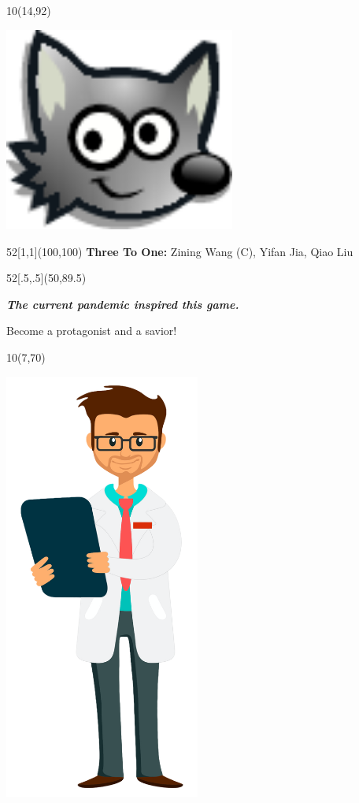 \documentclass[hyperref={pdfpagelabels=false}]{beamer}
\begin{document}
\begin{frame}
	\begin{textblock}{10}(14,92)
		\begin{blankbox}
			\centering
			\includegraphics[height=190pt]{img/SF-head.pdf}
		\end{blankbox}
	\end{textblock}

	\begin{textblock}{52}[1,1](100,100)
			\huge\textbf{{Three To One:}} Zining Wang (C), Yifan Jia, Qiao Liu
	\end{textblock}

	\begin{textblock}{52}[.5,.5](50,89.5)

		\centering\em\bf\Huge
			The current pandemic inspired this game. 

			Become a protagonist and a savior!

	\end{textblock}
	\begin{textblock}{10}(7,70)
		\begin{blankbox}
			\centering
			\includegraphics[height=400pt]{img/ai97b-ej97b.png}
		\end{blankbox}
	\end{textblock}


\end{frame}
\end{document}
